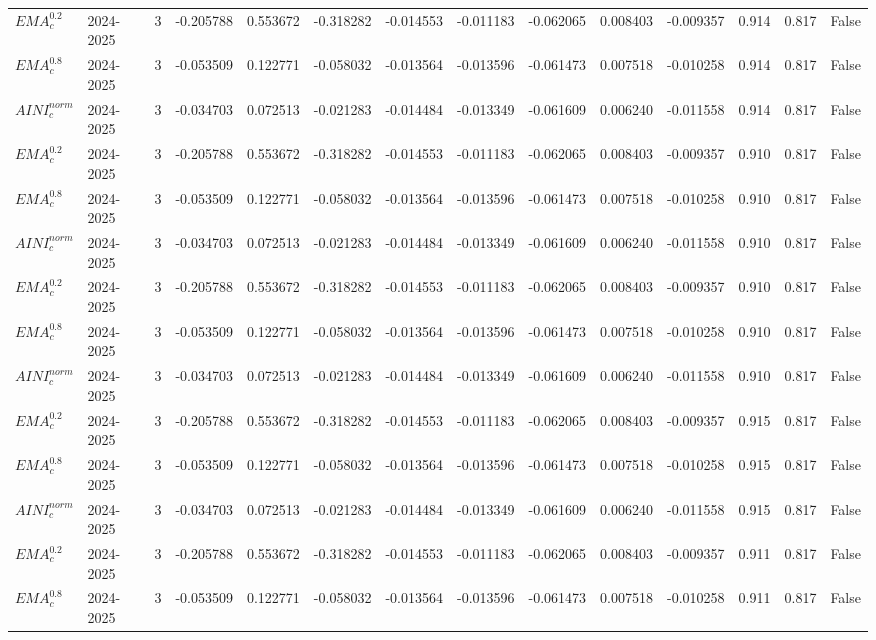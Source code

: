 \begin{tabular}{@{}llrrrrrrrrrlll@{}}
$EMA^{0.2}_{c}$ & 2024-2025 & 3 & -0.205788 & 0.553672 & -0.318282 & -0.014553 & -0.011183 & -0.062065 & 0.008403 & -0.009357 & 0.914 & 0.817 & False \\
$EMA^{0.8}_{c}$ & 2024-2025 & 3 & -0.053509 & 0.122771 & -0.058032 & -0.013564 & -0.013596 & -0.061473 & 0.007518 & -0.010258 & 0.914 & 0.817 & False \\
$AINI^{norm}_{c}$ & 2024-2025 & 3 & -0.034703 & 0.072513 & -0.021283 & -0.014484 & -0.013349 & -0.061609 & 0.006240 & -0.011558 & 0.914 & 0.817 & False \\
$EMA^{0.2}_{c}$ & 2024-2025 & 3 & -0.205788 & 0.553672 & -0.318282 & -0.014553 & -0.011183 & -0.062065 & 0.008403 & -0.009357 & 0.910 & 0.817 & False \\
$EMA^{0.8}_{c}$ & 2024-2025 & 3 & -0.053509 & 0.122771 & -0.058032 & -0.013564 & -0.013596 & -0.061473 & 0.007518 & -0.010258 & 0.910 & 0.817 & False \\
$AINI^{norm}_{c}$ & 2024-2025 & 3 & -0.034703 & 0.072513 & -0.021283 & -0.014484 & -0.013349 & -0.061609 & 0.006240 & -0.011558 & 0.910 & 0.817 & False \\
$EMA^{0.2}_{c}$ & 2024-2025 & 3 & -0.205788 & 0.553672 & -0.318282 & -0.014553 & -0.011183 & -0.062065 & 0.008403 & -0.009357 & 0.910 & 0.817 & False \\
$EMA^{0.8}_{c}$ & 2024-2025 & 3 & -0.053509 & 0.122771 & -0.058032 & -0.013564 & -0.013596 & -0.061473 & 0.007518 & -0.010258 & 0.910 & 0.817 & False \\
$AINI^{norm}_{c}$ & 2024-2025 & 3 & -0.034703 & 0.072513 & -0.021283 & -0.014484 & -0.013349 & -0.061609 & 0.006240 & -0.011558 & 0.910 & 0.817 & False \\
$EMA^{0.2}_{c}$ & 2024-2025 & 3 & -0.205788 & 0.553672 & -0.318282 & -0.014553 & -0.011183 & -0.062065 & 0.008403 & -0.009357 & 0.915 & 0.817 & False \\
$EMA^{0.8}_{c}$ & 2024-2025 & 3 & -0.053509 & 0.122771 & -0.058032 & -0.013564 & -0.013596 & -0.061473 & 0.007518 & -0.010258 & 0.915 & 0.817 & False \\
$AINI^{norm}_{c}$ & 2024-2025 & 3 & -0.034703 & 0.072513 & -0.021283 & -0.014484 & -0.013349 & -0.061609 & 0.006240 & -0.011558 & 0.915 & 0.817 & False \\
$EMA^{0.2}_{c}$ & 2024-2025 & 3 & -0.205788 & 0.553672 & -0.318282 & -0.014553 & -0.011183 & -0.062065 & 0.008403 & -0.009357 & 0.911 & 0.817 & False \\
$EMA^{0.8}_{c}$ & 2024-2025 & 3 & -0.053509 & 0.122771 & -0.058032 & -0.013564 & -0.013596 & -0.061473 & 0.007518 & -0.010258 & 0.911 & 0.817 & False \\

\end{tabular}
